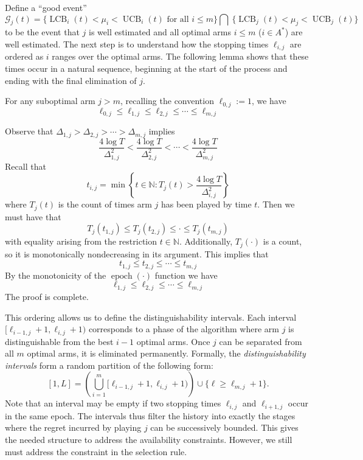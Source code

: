 \documentclass[opre,blindrev]{informs3}
\newcommand{\UCB}{\operatorname{UCB}}
\newcommand{\LCB}{\operatorname{LCB}}
\newcommand{\epoch}{\operatorname{epoch}}
\begin{document}
\begin{APPENDICES}
Define a ``good event''
\[
    \mathcal{G}_j(t)=\bigg\{\LCB_i(t)<\mu_i<\UCB_i(t) \text{ for all } i\leq m\bigg\} \bigcap ~\bigg\{\LCB_j(t)<\mu_j<\UCB_j(t)\bigg\}
\]
to be the event that \(j\) is well estimated and all optimal arms \(i\leq m\) (\(i\in A^*\)) are well estimated. The next step is to understand how the stopping times \(\ell_{i,j}\) are ordered as \(i\) ranges over the optimal arms. The following lemma shows that these times occur in a natural sequence, beginning at the start of the process and ending with the final elimination of \(j\).

\begin{lemma}\label{lem:ordered-intervals}
    For any suboptimal arm \(j>m\), recalling the convention \(\ell_{0,j}:=1\), we have
    \[\ell_{0,j}\leq \ell_{1,j}\leq \ell_{2,j}\leq \cdots \leq \ell_{m,j}\]
\end{lemma}
    Observe that \(\Delta_{1,j}>\Delta_{2,j}>\cdots >\Delta_{m,j}\) implies 
    \[\frac{4\log T}{\Delta^2_{1,j}}<\frac{4\log T}{\Delta^2_{2,j}}<\cdots < \frac{4\log T}{\Delta^2_{m,j}}\]
    Recall that 
    \[t_{i,j} = \min\left\{t\in \mathbb{N}:T_j(t)>\frac{4\log T}{\Delta^2_{i,j}}\right\}\]
    where \(T_j(t)\) is the count of times arm \(j\) has been played by time \(t\). Then we must have that 
    \[T_j(t_{1,j})\leq T_j(t_{2,j})\leq \cdot \leq T_j(t_{m,j})\]
    with equality arising from the restriction \(t\in \mathbb{N}\). Additionally, \(T_j(\cdot)\) is a count, so it is monotonically nondecreasing in its argument. This implies that 
    \[t_{1,j}\leq t_{2,j} \leq \cdots \leq t_{m,j}\]
    By the monotonicity of the \(\epoch(\cdot)\) function we have 
    \[\ell_{1,j}\leq \ell_{2,j}\leq \cdots \leq \ell_{m,j}\]
The proof is complete.
\Halmos  

This ordering allows us to define the distinguishability intervals. Each interval \([\ell_{i-1,j}+1, \ell_{i,j}+1)\) corresponds to a phase of the algorithm where arm \(j\) is distinguishable from the best \(i-1\) optimal arms. Once \(j\) can be separated from all \(m\) optimal arms, it is eliminated permanently. Formally, the \emph{distinguishability intervals} form a random partition of the following form:
\[
[1,L]=\left(\bigcup_{i=1}^m [\ell_{i-1,j}+1, \ell_{i,j}+1)\right)\cup \{\ell\geq \ell_{m,j}+1\}.
\]
Note that an interval may be empty if two stopping times \(\ell_{i,j}\) and \(\ell_{i+1,j}\) occur in the same epoch. The intervals thus filter the history into exactly the stages where the regret incurred by playing \(j\) can be successively bounded. This gives the needed structure to address the availability constraints. However, we still must address the constraint in the selection rule.


\end{APPENDICES}
\end{document}
